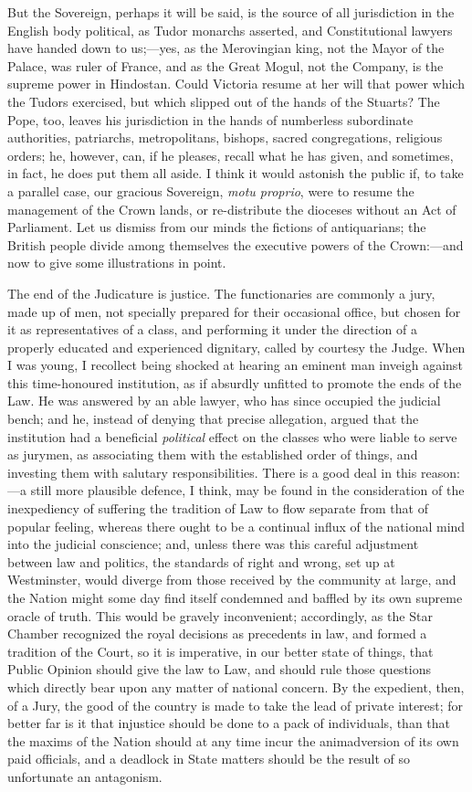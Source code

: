 But the Sovereign, perhaps it will be said, is
the source of all jurisdiction in the English body political, as Tudor
monarchs asserted, and Constitutional lawyers have handed down to
us;—yes, as the Merovingian king, not the Mayor of the Palace, was
ruler of France, and as the Great Mogul, not the Company, is the
supreme power in Hindostan. Could Victoria resume at her will that
power which the Tudors exercised, but which slipped out of the hands
of the Stuarts? The Pope, too, leaves his jurisdiction in the hands of
numberless subordinate authorities, patriarchs, metropolitans,
bishops, sacred congregations, religious orders; he, however, can, if
he pleases, recall what he has given, and sometimes, in fact, he does
put them all aside. I think it would astonish the public if, to take a
parallel case, our gracious Sovereign, \emph{motu proprio}, were to
resume the management of the Crown lands, or re-distribute the
dioceses without an Act of Parliament. Let us dismiss from our minds
the fictions of antiquarians; the British people divide among
themselves the executive powers of the Crown:—and now to give some
illustrations in point.

The end of the Judicature is justice. The
functionaries are commonly a jury, made up of men, not specially
prepared for their occasional office, but chosen for it as
representatives of a class, and performing it under the direction of a
properly educated and experienced dignitary, called by courtesy the
Judge. When I was young, I recollect being shocked at hearing an
eminent man inveigh against this time-honoured institution, as if
absurdly unfitted to promote the ends of the Law. He was answered by
an able lawyer, who has since occupied the judicial bench; and he,
instead of denying that precise allegation, argued that the
institution had a beneficial \emph{political} effect on the classes
who were liable to serve as jurymen, as associating them with the
established order of things, and investing them with salutary
responsibilities. There is a good deal in this reason:—a still more
plausible defence, I think, may be found in the consideration of the
inexpediency of suffering the tradition of Law to flow separate from
that of popular feeling, whereas there ought to be a continual influx
of the national mind into the judicial conscience; and, unless there
was this careful adjustment between law and politics, the standards of
right and wrong, set up at Westminster, would diverge from those
received by the community at large, and the Nation might some day find
itself condemned and baffled by its own supreme oracle of truth. This
would be gravely inconvenient; accordingly, as the Star Chamber
recognized the royal decisions as precedents in law, and formed a
tradition of the Court, so it is imperative, in our better state of
things, that Public Opinion should give the law to Law, and should
rule those questions which directly bear upon any matter of national
concern. By the expedient, then, of a Jury, the good of the country is
made to take the lead of private interest; for better far is it that
injustice should be done to a pack of individuals, than that the
maxims of the Nation should at any time incur the animadversion of its
own paid officials, and a deadlock in State matters should be the
result of so unfortunate an antagonism.

